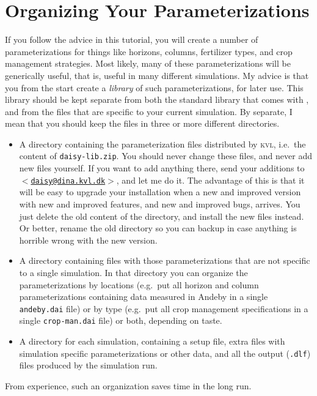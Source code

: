 \documentclass[a4paper,11pt]{article}
\begin{document}
\section{Organizing Your Parameterizations}
\label{sec:files}

If you follow the advice in this tutorial, you will create a number of
parameterizations for things like horizons, columns, fertilizer types,
and crop management strategies.  Most likely, many of these
parameterizations will be generically useful, that is, useful in many
different simulations.  My advice is that you from the start create a
\emph{library} of such parameterizations, for later use.  This library
should be kept separate from both the standard library that comes with
\daisy{}, and from the files that are specific to your current
simulation.  By separate, I mean that you should keep the files in
three or more different directories.
\begin{itemize}
\item A directory containing the parameterization files distributed by
  \textsc{kvl}, i.e.\ the content of \texttt{daisy-lib.zip}.  You
  should never change these files, and never add new files yourself.
  If you want to add anything there, send your additions to
  \href{mailto:daisy@dina.kvl.dk}{\texttt{$<$daisy@dina.kvl.dk$>$}},
  and let me do it.  The advantage of this is that it will be easy to
  upgrade your \daisy{} installation when a new and improved version
  with new and improved features, and new and improved bugs, arrives.
  You just delete the old content of the directory, and install the
  new files instead.  Or better, rename the old directory so you can
  backup in case anything is horrible wrong with the new version.
\item A directory containing files with those parameterizations that
  are not specific to a single simulation.  In that directory you can
  organize the parameterizations by locations (e.g.\ put all horizon
  and column parameterizations containing data measured in Andeby in a
  single \texttt{andeby.dai} file) or by type (e.g.\ put all crop
  management specifications in a single \texttt{crop-man.dai} file) or
  both, depending on taste.
\item A directory for each simulation, containing a setup file, extra
  files with simulation specific parameterizations or other data, and
  all the output (\texttt{.dlf}) files produced by the simulation run.
\end{itemize}
From experience, such an organization saves time in the long run.  
\end{document}
